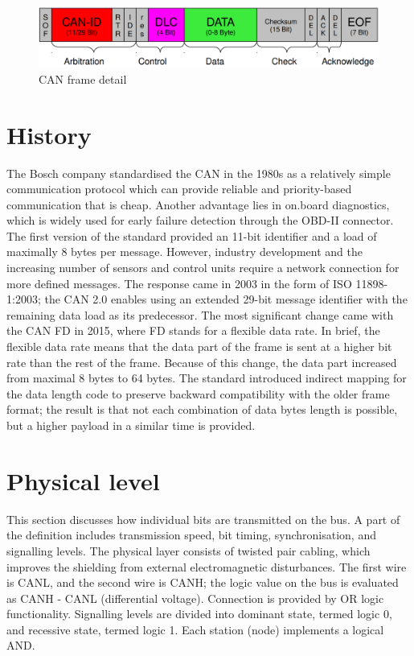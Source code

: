 \documentclass{ctuthesis}
\begin{document}
\begin{figure}[htb]
 \includegraphics[width=1\textwidth]{images/can_frame.pdf}
 \caption{CAN frame detail \cite{can_frame}}
\end{figure}

 \section{History}
 The Bosch company standardised the CAN in the 1980s as a relatively simple communication protocol which can provide reliable and priority-based communication that is cheap\cite{history}. Another advantage lies in on.board diagnostics, which is widely used for early failure detection through the OBD-II connector. The first version of the standard provided an 11-bit identifier and a load of maximally 8 bytes per message. However, industry development and the increasing number of sensors and control units require a network connection for more defined messages. The response came in 2003 in the form of  ISO 11898-1:2003; the CAN 2.0 enables using an extended 29-bit message identifier with the remaining data load as its predecessor. The most significant change came with the CAN FD in 2015, where FD stands for a flexible data rate. In brief, the flexible data rate means that the data part of the frame is sent at a higher bit rate than the rest of the frame. Because of this change, the data part increased from maximal 8 bytes to 64 bytes\cite{can_fd}. The standard introduced indirect mapping for the data length code to preserve backward compatibility with the older frame format; the result is that not each combination of data bytes length is possible, but a higher payload in a similar time is provided.


 \section{Physical level}
 This section discusses how individual bits are transmitted on the bus. A part of the definition includes transmission speed, bit timing, synchronisation, and signalling levels. The physical layer consists of twisted pair cabling, which improves the shielding from external electromagnetic disturbances. The first wire is CANL, and the second wire is CANH; the logic value on the bus is evaluated as CANH - CANL (differential voltage). Connection is provided by OR logic functionality. Signalling levels are divided into dominant state, termed logic 0, and recessive state, termed logic 1. Each station (node) implements a logical AND.
 
\end{document}
